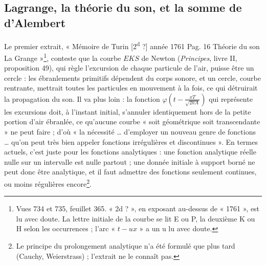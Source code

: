 \documentclass[11pt,a4paper]{article}
\begin{document}
\subsection*{Lagrange, la théorie du son, et la somme de d'Alembert}

Le premier extrait, « Mémoire de Turin [2\textsuperscript{d} ?] année 1761 Pag. 16 Théorie du son La Grange »\footnote{Vues 734 et 735, feuillet 365. « 2d ? », en exposant au-dessus de « 1761 », est lu avec doute. La lettre initiale de la courbe se lit E ou P, la deuxième K ou H selon les occurrences ; l'arc « $t-ux$ » a un u lu avec doute.}, conteste que la courbe $EKS$ de Newton (\emph{Principes}, livre II, proposition 49), qui règle l'excursion de chaque particule de l'air, puisse être un cercle : les ébranlements primitifs dépendent du corps sonore, et un cercle, courbe rentrante, mettrait toutes les particules en mouvement à la fois, ce qui détruirait la propagation du son. Il va plus loin : la fonction $\varphi\left(t-\frac{xT}{\sqrt{2hA}}\right)$ qui représente les excursions doit, à l'instant initial, s'annuler identiquement hors de la petite portion d'air ébranlée, ce qu'aucune courbe « soit géométrique soit transcendante » ne peut faire ; d'où « la nécessité … d'employer un nouveau genre de fonctions … qu'on peut très bien appeler fonctions irrégulières et discontinues ». En termes actuels, c'est juste pour les fonctions analytiques : une fonction analytique réelle nulle sur un intervalle est nulle partout ; une donnée initiale à support borné ne peut donc être analytique, et il faut admettre des fonctions seulement continues, ou moins régulières encore\footnote{Le principe du prolongement analytique n'a été formulé que plus tard (Cauchy, Weierstrass) ; l'extrait ne le connaît pas.}.
\end{document}

